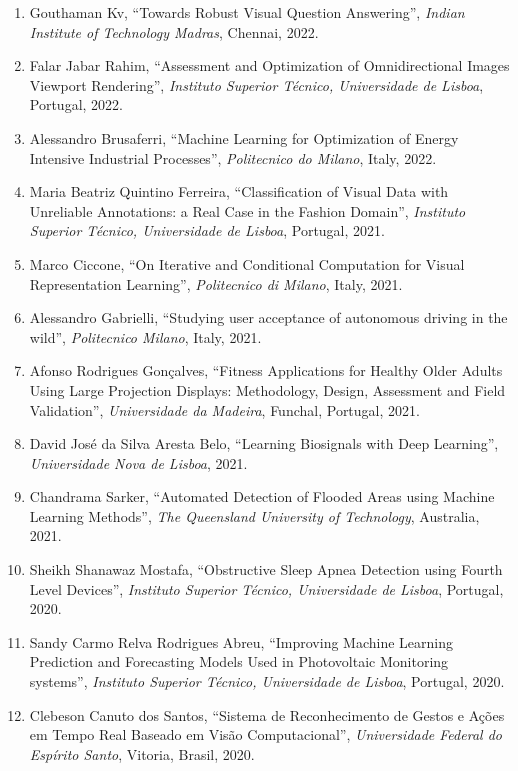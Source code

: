 \documentclass[
]{article}
\begin{document}
\begin{enumerate}
\item
  Gouthaman Kv, ``Towards Robust Visual Question Answering'',
  \emph{Indian Institute of Technology Madras}, Chennai, 2022.
\item
  Falar Jabar Rahim, ``Assessment and Optimization of Omnidirectional
  Images Viewport Rendering'', \emph{Instituto Superior Técnico,
  Universidade de Lisboa}, Portugal, 2022.
\item
  Alessandro Brusaferri, ``Machine Learning for Optimization of Energy
  Intensive Industrial Processes'', \emph{Politecnico do Milano}, Italy,
  2022.
\item
  Maria Beatriz Quintino Ferreira, ``Classification of Visual Data with
  Unreliable Annotations: a Real Case in the Fashion Domain'',
  \emph{Instituto Superior Técnico, Universidade de Lisboa}, Portugal,
  2021.
\item
  Marco Ciccone, ``On Iterative and Conditional Computation for Visual
  Representation Learning'', \emph{Politecnico di Milano}, Italy, 2021.
\item
  Alessandro Gabrielli, ``Studying user acceptance of autonomous driving
  in the wild'', \emph{Politecnico Milano}, Italy, 2021.
\item
  Afonso Rodrigues Gonçalves, ``Fitness Applications for Healthy Older
  Adults Using Large Projection Displays: Methodology, Design,
  Assessment and Field Validation'', \emph{Universidade da Madeira},
  Funchal, Portugal, 2021.
\item
  David José da Silva Aresta Belo, ``Learning Biosignals with Deep
  Learning'', \emph{Universidade Nova de Lisboa}, 2021.
\item
  Chandrama Sarker, ``Automated Detection of Flooded Areas using Machine
  Learning Methods'', \emph{The Queensland University of Technology},
  Australia, 2021.
\item
  Sheikh Shanawaz Mostafa, ``Obstructive Sleep Apnea Detection using
  Fourth Level Devices'', \emph{Instituto Superior Técnico, Universidade
  de Lisboa}, Portugal, 2020.
\item
  Sandy Carmo Relva Rodrigues Abreu, ``Improving Machine Learning
  Prediction and Forecasting Models Used in Photovoltaic Monitoring
  systems'', \emph{Instituto Superior Técnico, Universidade de Lisboa},
  Portugal, 2020.
\item
  Clebeson Canuto dos Santos, ``Sistema de Reconhecimento de Gestos e
  Ações em Tempo Real Baseado em Visão Computacional'',
  \emph{Universidade Federal do Espírito Santo}, Vitoria, Brasil, 2020.

\end{enumerate}
\end{document}
